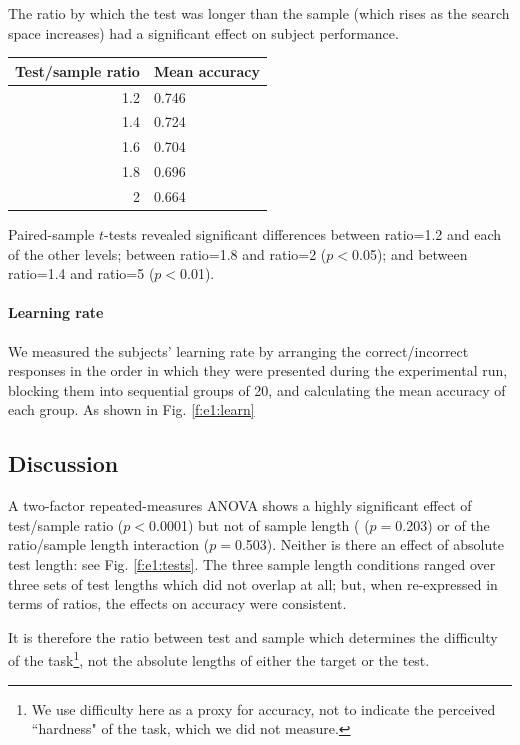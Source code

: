 The ratio by which the test was longer than the sample (which rises as the search space increases) had a significant effect on subject performance.

\begin{center}
\begin{tabular}{ r | l   }
\textbf{Test/sample ratio} & \textbf{Mean accuracy}\\
\hline
1.2 &  0.746\\
1.4 &  0.724\\
1.6 & 0.704\\
1.8 &  0.696\\
 2&  0.664\\
\end{tabular}
\end{center}

Paired-sample $t$-tests revealed significant differences between ratio=1.2 and each of the other levels; between ratio=1.8 and ratio=2 ($p<$0.05); and between ratio=1.4 and ratio=5 ($p<$0.01).

\paragraph{Learning rate}

We measured the subjects' learning rate by arranging the correct/incorrect responses in the order in which they were presented during the experimental run, blocking them into sequential groups of 20, and calculating the mean accuracy of each group. As shown in Fig. \ref{f:e1:learn}

\subsection{Discussion}

A two-factor repeated-measures ANOVA shows a highly significant effect of test/sample ratio ($p<$0.0001) but not of sample length ( ($p=$0.203) or of the ratio/sample length interaction ($p=$0.503). Neither is there an effect of absolute test length: see Fig. \ref{f:e1:tests}. The three sample length conditions ranged over three sets of test lengths which did not overlap at all; but, when re-expressed in terms of ratios, the effects on accuracy were consistent.

It is therefore the ratio between test and sample which determines the difficulty of the task\footnote{We use difficulty here as a proxy for accuracy, not to indicate the perceived ``hardness" of the task, which we did not measure.}, not the absolute lengths of either the target or the test.

